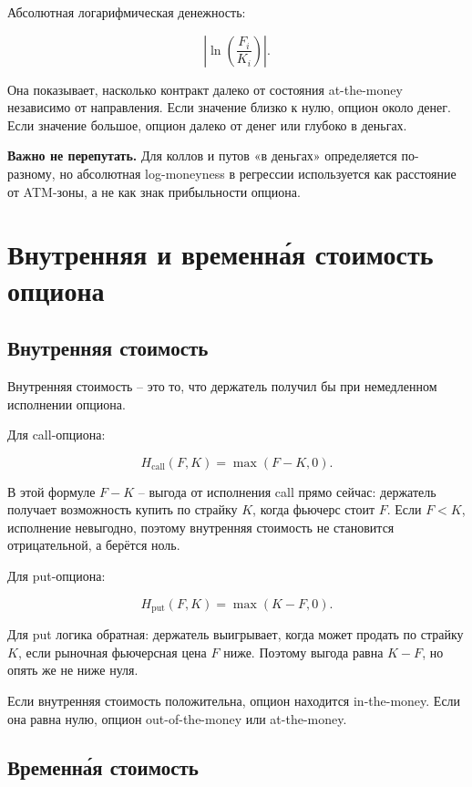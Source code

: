 \documentclass[11pt,a4paper]{article}
\newcommand{\warn}[1]{%
  \vspace{0.15em}
  \noindent\colorbox{softred}{%
    \parbox{\dimexpr\linewidth-2\fboxsep\relax}{\textbf{Важно не перепутать.} #1}%
  }\vspace{0.2em}
}
\begin{document}
Абсолютная логарифмическая денежность:

\begin{equation}
\left|\ln\left(\frac{F_i}{K_i}\right)\right|.
\end{equation}

Она показывает, насколько контракт далеко от состояния at-the-money независимо от направления. Если значение близко к нулю, опцион около денег. Если значение большое, опцион далеко от денег или глубоко в деньгах.

\warn{Для коллов и путов «в деньгах» определяется по-разному, но абсолютная log-moneyness в регрессии используется как расстояние от ATM-зоны, а не как знак прибыльности опциона.}

\section{Внутренняя и временна́я стоимость опциона}

\subsection{Внутренняя стоимость}

Внутренняя стоимость -- это то, что держатель получил бы при немедленном исполнении опциона.

Для call-опциона:

\begin{equation}
H_{\text{call}}(F,K)=\max(F-K,0).
\end{equation}

В этой формуле $F-K$ -- выгода от исполнения call прямо сейчас: держатель получает возможность купить по страйку $K$, когда фьючерс стоит $F$. Если $F<K$, исполнение невыгодно, поэтому внутренняя стоимость не становится отрицательной, а берётся ноль.

Для put-опциона:

\begin{equation}
H_{\text{put}}(F,K)=\max(K-F,0).
\end{equation}

Для put логика обратная: держатель выигрывает, когда может продать по страйку $K$, если рыночная фьючерсная цена $F$ ниже. Поэтому выгода равна $K-F$, но опять же не ниже нуля.

Если внутренняя стоимость положительна, опцион находится in-the-money. Если она равна нулю, опцион out-of-the-money или at-the-money.

\subsection{Временна́я стоимость}
\end{document}
